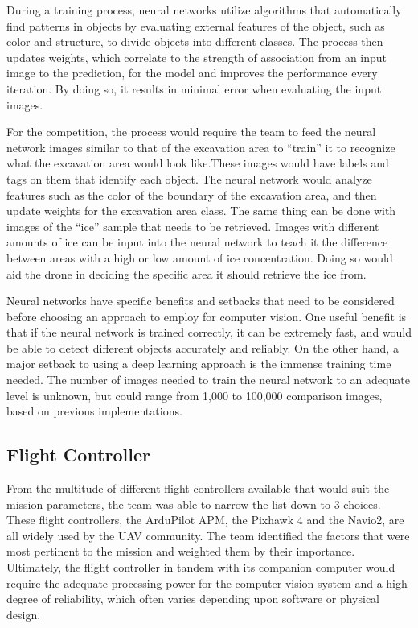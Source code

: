 			During a training process, neural networks utilize algorithms that automatically find patterns in objects by evaluating external features of the object, such as color and structure, to divide objects into different classes. The process then updates weights, which correlate to the strength of association from an input image to the prediction, for the model and improves the performance every iteration. By doing so, it results in minimal error when evaluating the input images.
		
			For the competition, the process would require the team to feed the neural network images similar to that of the excavation area to “train” it to recognize what the excavation area would look like.These images would have labels and tags on them that identify each object. The neural network would analyze features such as the color of the boundary of the excavation area, and then update weights for the excavation area class. The same thing can be done with images of the “ice” sample that needs to be retrieved. Images with different amounts of ice can be input into the neural network to teach it the difference between areas with a high or low amount of ice concentration. Doing so would aid the drone in deciding the specific area it should retrieve the ice from.
		
			Neural networks have specific benefits and setbacks that need to be considered before choosing an approach to employ for computer vision. One useful benefit is that if the neural network is trained correctly, it can be extremely fast, and would be able to detect different objects accurately and reliably. On the other hand, a major setback to using a deep learning approach is the immense training time needed. The number of images needed to train the neural network to an adequate level is unknown, but could range from 1,000 to 100,000 comparison images, based on previous implementations.

	\subsection{Flight Controller}
		From the multitude of different flight controllers available that would suit the mission parameters, the team was able to narrow the list down to 3 choices. These flight controllers, the ArduPilot APM, the Pixhawk 4 and the Navio2, are all widely used by the UAV community. The team identified the factors that were most pertinent to the mission and weighted them by their importance. Ultimately, the flight controller in tandem with its companion computer would require the adequate processing power for the computer vision system and a high degree of reliability, which often varies depending upon software or physical design.

